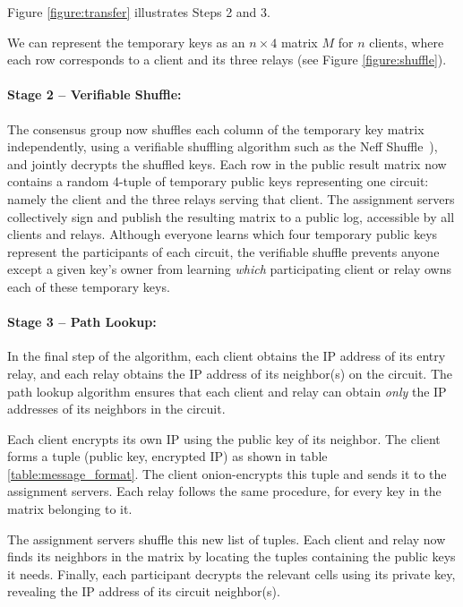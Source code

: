 Figure \ref{figure:transfer} illustrates Steps 2 and 3.

We can represent the temporary keys as an $n \times 4$ matrix $M$ for $n$
clients, where each row corresponds to a client and its three relays (see
Figure \ref{figure:shuffle}).




\paragraph{Stage 2 -- Verifiable Shuffle:}
The consensus group now shuffles
each column of the temporary key matrix independently,
using a verifiable shuffling algorithm
such as the Neff Shuffle~\cite{neff2001verifiable}),
and jointly decrypts the shuffled keys.
Each row in the public result matrix now contains
a random 4-tuple of temporary public keys representing one circuit:
namely the client and the three relays serving that client.
The assignment servers collectively sign and publish the resulting matrix to a
public log, accessible by all clients and relays.
Although everyone learns which four temporary public keys
represent the participants of each circuit,
the verifiable shuffle prevents anyone except a given key's owner from learning
{\em which} participating client or relay owns each of these temporary keys.

\paragraph{Stage 3 -- Path Lookup:}
In the final step of the algorithm, each client obtains the
IP address of its entry relay, and each relay obtains the IP address of its
neighbor(s) on the circuit. The path lookup algorithm ensures that each client
and relay can obtain {\em only} the IP addresses
of its neighbors in the circuit.

Each client encrypts its own IP using the public key of its neighbor.
The client
forms a tuple (public key, encrypted IP) as shown in table
\ref{table:message_format}.
The client onion-encrypts this tuple and sends it to the
assignment servers.
Each relay follows the same procedure, for every key in the
matrix belonging to it.

The assignment servers shuffle this new list of tuples. Each
client and relay now finds its neighbors in the matrix by locating the tuples
containing the public keys it needs. Finally,
each participant decrypts the relevant cells using
its private key, revealing the IP address of its circuit neighbor(s).


